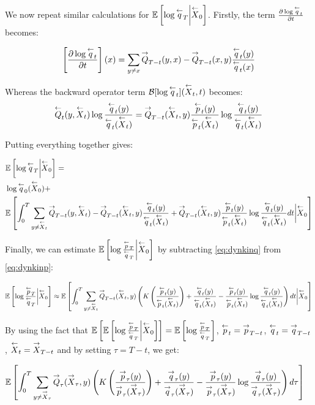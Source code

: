 We now repeat similar calculations for $\expected\left[\log\bq_T\bigg|\bproc_0\right]$. Firstly, the term $\frac{\partial \log\bq_t}{\partial t}$ becomes:

\begin{equation}
    \left[\frac{\partial \log\bq_t}{\partial t}\right](x) = \sum_{y\neq x} \fratesp_{T-t}(y,x) - \fratesp_{T-t}(x,y)\frac{\bq_t(y)}{\bq_t(x)}
\end{equation}

Whereas the backward operator term $\boperator[\log\bq_t](\bproc_t,t)$ becomes:
\begin{equation}
    \bratesp_t(y,\bproc_t)\log\frac{\bq_t(y)}{\bq_t(\bproc_t)}=\fratesp_{T-t}(\bproc_t,y)\frac{\bp_t(y)}{\bp_t(\bproc_t)}\log\frac{\bq_t(y)}{\bq_t(\bproc_t)}
\end{equation}

Putting everything together gives:

{\begin{align}\label{eq:dynkinq}
    &\expected\left[\log\bq_T\bigg|\bproc_0\right] = \\ &\log\bq_0(\bproc_0)+ \nonumber\\&\expected\left[\int_0^T\sum_{y\neq \bproc_t} \fratesp_{T-t}(y,\bproc_t) - \fratesp_{T-t}(\bproc_t,y)\frac{\bq_t(y)}{\bq_t(\bproc_t)}+\fratesp_{T-t}(\bproc_t,y)\frac{\bp_t(y)}{\bp_t(\bproc_t)}\log\frac{\bq_t(y)}{\bq_t(\bproc_t)}dt\bigg|\bproc_0\right] \nonumber
\end{align}}

Finally, we can estimate $\expected\left[\log\frac{\bp_T}{\bq_T}\bigg|\bproc_0\right]$ by subtracting \eqref{eq:dynkinq} from \eqref{eq:dynkinp}:

{\scriptsize\begin{equation}
    \expected\left[\log\frac{\bp_T}{\bq_T}\bigg|\bproc_0\right] \approx \expected\left[\int_0^T\sum_{y\neq \bproc_t} \fratesp_{T-t}(\bproc_t,y)\left(K\left(\frac{\bp_t(y)}{\bp_t(\bproc_t)}\right)+\frac{\bq_t(y)}{\bq_t(\bproc_t)}-\frac{\bp_t(y)}{\bp_t(\bproc_t)}\log\frac{\bq_t(y)}{\bq_t(\bproc_t)}\right)dt\bigg|\bproc_0\right] \nonumber
\end{equation}}

By using the fact that $\expected\left[\expected\left[\log\frac{\bp_T}{\bq_T}\bigg|\bproc_0\right]\right]=\expected\left[\log\frac{\bp_T}{\bq_T}\right]$, $\bp_t=\fp_{T-t}$, $\bq_t=\fq_{T-t}$, $\bproc_t=\fproc_{T-t}$ and by setting $\tau=T-t$, we get:

\begin{align}
&\expected\left[\int_0^T\sum_{y\neq \fproc_\tau} \fratesp_{\tau}(\fproc_\tau,y)\left(K\left(\frac{\fp_\tau(y)}{\fp_\tau(\fproc_\tau)}\right)+\frac{\fq_\tau(y)}{\fq_\tau(\fproc_\tau)}-\frac{\fp_\tau(y)}{\fp_\tau(\fproc_\tau)}\log\frac{\fq_\tau(y)}{\fq_\tau(\fproc_\tau)}\right)d\tau\right]
\end{align}

